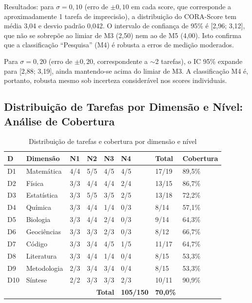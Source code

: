Resultados: para $\sigma = 0,10$ (erro de $\pm 0,10$ em cada score, que
corresponde a aproximadamente 1 tarefa de imprecisão), a distribuição do
CORA-Score tem média 3,04 e desvio padrão 0,042. O intervalo de confiança
de 95\% é [2,96; 3,12], que não se sobrepõe ao limiar de M3 (2,50) nem ao
de M5 (4,00). Isto confirma que a classificação ``Pesquisa'' (M4) é robusta
a erros de medição moderados.

Para $\sigma = 0,20$ (erro de $\pm 0,20$, correspondente a $\sim$2 tarefas),
o IC 95\% expande para [2,88; 3,19], ainda mantendo-se acima do limiar de
M3. A classificação M4 é, portanto, robusta mesmo sob incerteza considerável
nos scores individuais.

\subsection{Distribuição de Tarefas por Dimensão e Nível: Análise de Cobertura}

\begin{table}[H]\centering\footnotesize
\caption{Distribuição de tarefas e cobertura por dimensão e nível}
\label{tab:coverage}
\begin{tabular}{p{}p{}p{}p{}p{}p{}p{}p{}}
\toprule
\textbf{D} & \textbf{Dimensão} & \textbf{N1} & \textbf{N2} & \textbf{N3} & \textbf{N4} & \textbf{Total} & \textbf{Cobertura} \\
\midrule
D1 & Matemática & 4/4 & 5/5 & 4/5 & 4/5 & 17/19 & 89,5\% \\
D2 & Física & 3/3 & 4/4 & 4/4 & 2/4 & 13/15 & 86,7\% \\
D3 & Estatística & 3/3 & 5/5 & 3/5 & 2/5 & 13/18 & 72,2\% \\
D4 & Química & 3/3 & 4/4 & 1/4 & 0/3 & 8/14 & 57,1\% \\
D5 & Biologia & 3/3 & 4/4 & 2/4 & 0/3 & 9/14 & 64,3\% \\
D6 & Geociências & 3/3 & 3/3 & 2/3 & 0/3 & 8/12 & 66,7\% \\
D7 & Código & 3/3 & 3/4 & 4/5 & 1/5 & 11/17 & 64,7\% \\
D8 & Literatura & 3/3 & 4/4 & 1/4 & 0/4 & 8/15 & 53,3\% \\
D9 & Metodologia & 2/3 & 3/4 & 3/4 & 0/4 & 8/15 & 53,3\% \\
D10 & Síntese & 2/2 & 3/3 & 3/3 & 2/3 & 10/11 & 90,9\% \\
\midrule
\multicolumn{5}{r}{\textbf{Total}} & \textbf{105/150} & \textbf{70,0\%} \\
\bottomrule
\end{tabular}
\end{table}


